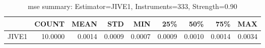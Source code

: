 \begin{table}[ht]
\centering
\caption{mse summary: Estimator=JIVE1, Instruments=333, Strength=0.90}
\begin{tabular}{lrrrrrrrr}
\toprule
 & COUNT & MEAN & STD & MIN & 25\% & 50\% & 75\% & MAX \\
\midrule
JIVE1 & 10.0000 & 0.0014 & 0.0009 & 0.0007 & 0.0009 & 0.0010 & 0.0014 & 0.0034 \\
\bottomrule
\end{tabular}
\end{table}
